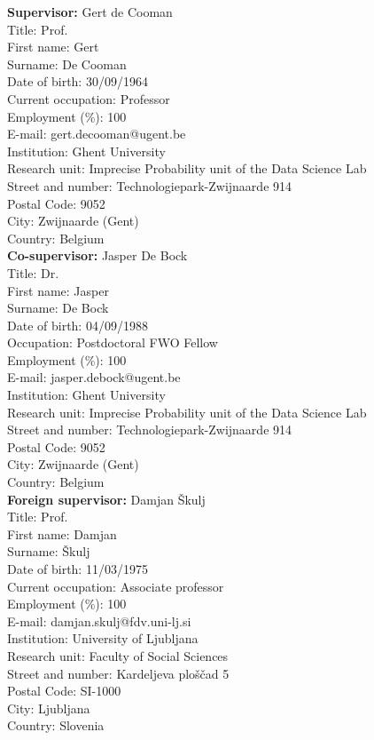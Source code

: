 \documentclass[11pt,dvipsnames,usenames,a4paper]{article}
\begin{document}
\textbf{Supervisor:} Gert de Cooman\\
Title: Prof.\\
First name: Gert\\
Surname: De Cooman\\
Date of birth: 30/09/1964\\
Current occupation: Professor\\
Employment (\%): 100\\
E-mail: gert.decooman@ugent.be\\
Institution: Ghent University\\
Research unit: Imprecise Probability unit of the Data Science Lab\\
Street and number: Technologiepark-Zwijnaarde 914\\
Postal Code: 9052\\
City: Zwijnaarde (Gent)\\
Country: Belgium\\[7pt]
\textbf{Co-supervisor:} Jasper De Bock\\
Title: Dr.\\
First name: Jasper\\
Surname: De Bock\\
Date of birth: 04/09/1988\\
Occupation: Postdoctoral FWO Fellow\\
Employment (\%): 100\\
E-mail: jasper.debock@ugent.be\\
Institution: Ghent University\\
Research unit: Imprecise Probability unit of the Data Science Lab\\
Street and number: Technologiepark-Zwijnaarde 914\\
Postal Code: 9052\\
City: Zwijnaarde (Gent)\\
Country: Belgium\\[7pt]
\textbf{Foreign supervisor:} Damjan {\v S}kulj\\
Title: Prof.\\
First name: Damjan\\
Surname: {\v S}kulj\\
Date of birth: {11/03/1975}\\
Current occupation: {Associate professor}\\
Employment (\%): {100}\\
E-mail: {damjan.skulj@fdv.uni-lj.si}\\
Institution: University of Ljubljana\\
Research unit: {Faculty of Social Sciences}\\
Street and number: {Kardeljeva plo\v s\v cad 5}\\
Postal Code: {SI-1000}\\
City: {Ljubljana}\\
Country: {Slovenia}\\%
\end{document}
